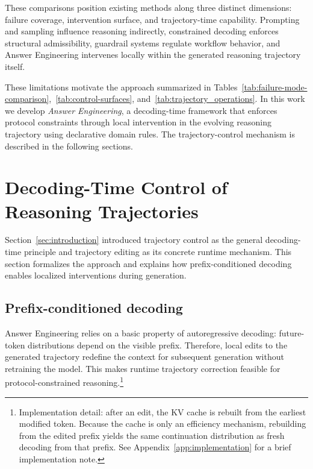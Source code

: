 \documentclass[twocolumn]{article}
\begin{document}
These comparisons position existing methods along three distinct dimensions:
failure coverage, intervention surface, and trajectory-time capability.
Prompting and sampling influence reasoning indirectly, constrained decoding
enforces structural admissibility, guardrail systems regulate workflow behavior,
and Answer Engineering intervenes locally within the generated reasoning
trajectory itself.

These limitations motivate the approach summarized in
Tables~\ref{tab:failure-mode-comparison},~\ref{tab:control-surfaces},
and~\ref{tab:trajectory_operations}. In
this work we develop \emph{Answer Engineering}, a decoding-time framework that
enforces protocol constraints through local intervention in the evolving
reasoning trajectory using declarative domain rules. The trajectory-control
mechanism is described in the following sections.

\section{Decoding-Time Control of Reasoning
Trajectories}\label{sec:trajectory_control}

Section~\ref{sec:introduction} introduced trajectory control as the general
decoding-time principle and trajectory editing as its concrete runtime mechanism.
This section formalizes the approach and explains how prefix-conditioned decoding
enables localized interventions during generation.


\subsection{Prefix-conditioned decoding}\label{sec:prefix-conditioned}

Answer Engineering relies on a basic property of autoregressive decoding:
future-token distributions depend on the visible prefix. Therefore, local edits
to the generated trajectory redefine the context for subsequent generation
without retraining the model. This makes runtime trajectory correction feasible
for protocol-constrained reasoning.\footnote{Implementation detail: after an
edit, the KV cache is rebuilt from the earliest modified token. Because the
cache is only an efficiency mechanism, rebuilding from the edited prefix yields
the same continuation distribution as fresh decoding from that prefix. See
Appendix~\ref{app:implementation} for a brief implementation note.}
\end{document}
